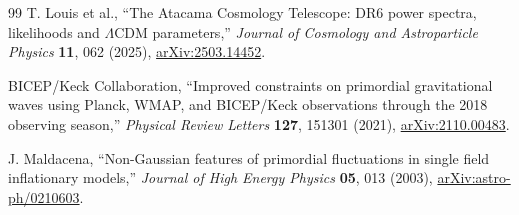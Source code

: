 \documentclass[11pt]{article}
\numberwithin{equation}{section}
\begin{document}
\begin{thebibliography}{99}
T. Louis et al.,
``The Atacama Cosmology Telescope: DR6 power spectra, likelihoods and $\Lambda$CDM parameters,''
\emph{Journal of Cosmology and Astroparticle Physics} \textbf{11}, 062 (2025),
\href{https://arxiv.org/abs/2503.14452}{arXiv:2503.14452}.

BICEP/Keck Collaboration,
``Improved constraints on primordial gravitational waves using Planck, WMAP, and BICEP/Keck observations through the 2018 observing season,''
\emph{Physical Review Letters} \textbf{127}, 151301 (2021),
\href{https://arxiv.org/abs/2110.00483}{arXiv:2110.00483}.

J. Maldacena,
``Non-Gaussian features of primordial fluctuations in single field inflationary models,''
\emph{Journal of High Energy Physics} \textbf{05}, 013 (2003),
\href{https://arxiv.org/abs/astro-ph/0210603}{arXiv:astro-ph/0210603}.

\end{thebibliography}
\end{document}
